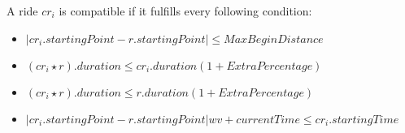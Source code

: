 A ride $cr_i$ is compatible if it fulfills every following condition:
\begin{itemize}
	\item $| cr_i.startingPoint - r.startingPoint | \leq MaxBeginDistance$
	\item $(cr_i \star r).duration  \leq cr_i.duration( 1+ ExtraPercentage)$
	\item $(cr_i \star r).duration  \leq r.duration( 1+ ExtraPercentage)$
	\item $ | cr_i.startingPoint - r.startingPoint | wv +currentTime \leq cr_i.startingTime$
\end{itemize}
